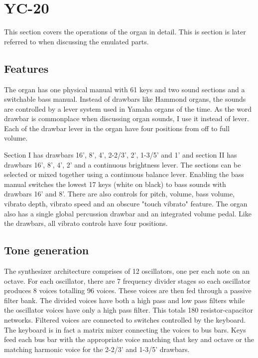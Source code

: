 \documentclass[11pt,a4paper]{article}
\begin{document}
\section{YC-20}
\label{section:yc-20}

This section covers the operations of the organ in detail\cite{yamaha:yc20}. This is section is later referred to when discussing the emulated parts.

\subsection{Features}

The organ has one physical manual with 61 keys and two sound sections and a switchable bass manual. Instead of drawbars like Hammond organs, the sounds are controlled by a lever system used in Yamaha organs of the time. As the word drawbar is commonplace when discussing organ sounds, I use it instead of lever. Each of the drawbar lever in the organ have four positions from off to full volume. 

Section I has drawbars 16', 8', 4', 2-2/3', 2', 1-3/5' and 1' and section II has drawbars 16', 8', 4', 2' and a continuous brightness lever. The sections can be selected or mixed together using a continuous balance lever. Enabling the bass manual switches the lowest 17 keys (white on black) to bass sounds with drawbars 16' and 8'. There are also controls for pitch, volume, bass volume, vibrato depth, vibrato speed and an obscure "touch vibrato" feature. The organ also has a single global percussion drawbar and an integrated volume pedal. Like the drawbars, all vibrato controls have four positions.

\subsection{Tone generation}

The synthesizer architecture comprises of 12 oscillators, one per each note on an octave. For each oscillator, there are 7 frequency divider stages so each oscillator produces 8 voices totalling 96 voices. These voices are then fed through a passive filter bank. The divided voices have both a high pass and low pass filters while the oscillator voices have only a high pass filter. This totals 180 resistor-capacitor networks. Filtered voices are connected to switches controlled by the keyboard. The keyboard is in fact a matrix mixer connecting the voices to bus bars. Keys feed each bus bar with the appropriate voice matching that key and octave or the matching harmonic voice for the 2-2/3' and 1-3/5' drawbars. 
\end{document}
